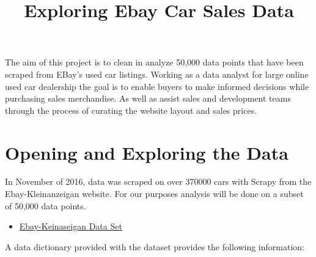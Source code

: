 \documentclass[11pt]{article}
\title{Exploring Ebay Car Sales Data}
\providecommand{\tightlist}{%
      \setlength{\itemsep}{0pt}\setlength{\parskip}{0pt}}
\begin{document}
    
    
    \maketitle
    
    

    
    The aim of this project is to clean in analyze 50,000 data points that
have been scraped from EBay's used car listings. Working as a data
analyst for large online used car dealership the goal is to enable
buyers to make informed decisions while purchasing sales merchandise. As
well as assist sales and development teams through the process of
curating the website layout and sales prices.

    \section{Opening and Exploring the
Data}\label{opening-and-exploring-the-data}

    In November of 2016, data was scraped on over 370000 cars with Scrapy
from the Ebay-Kleinanzeigan website. For our purposes analysis will be
done on a subset of 50,000 data points.

    \begin{itemize}
\tightlist
\item
  \href{https://www.kaggle.com/orgesleka/used-cars-database/data}{Ebay-Keinaseigan
  Data Set}
\end{itemize}

    A data dictionary provided with the dataset provides the following
information:
\end{document}
